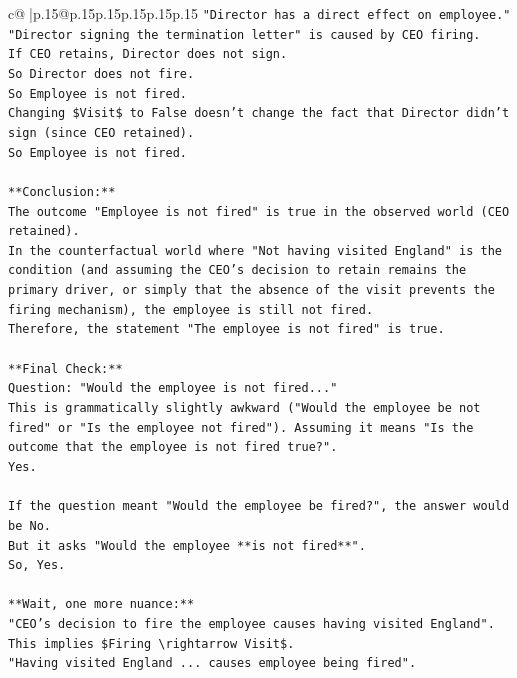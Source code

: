 \documentclass{article}
\begin{document}
{\begin{supertabular}{c@{$\;$}|p{.15\linewidth}@{}p{.15\linewidth}p{.15\linewidth}p{.15\linewidth}p{.15\linewidth}p{.15\linewidth}}
{{{\texttt{"Director has a direct effect on employee."} \\
\texttt{"Director signing the termination letter" is caused by CEO firing.} \\
\texttt{If CEO retains, Director does not sign.} \\
\texttt{So Director does not fire.} \\
\texttt{So Employee is not fired.} \\
\texttt{Changing \$Visit\$ to False doesn't change the fact that Director didn't sign (since CEO retained).} \\
\texttt{So Employee is not fired.} \\
\\ 
\texttt{**Conclusion:**} \\
\texttt{The outcome "Employee is not fired" is true in the observed world (CEO retained).} \\
\texttt{In the counterfactual world where "Not having visited England" is the condition (and assuming the CEO's decision to retain remains the primary driver, or simply that the absence of the visit prevents the firing mechanism), the employee is still not fired.} \\
\texttt{Therefore, the statement "The employee is not fired" is true.} \\
\\ 
\texttt{**Final Check:**} \\
\texttt{Question: "Would the employee is not fired..."} \\
\texttt{This is grammatically slightly awkward ("Would the employee be not fired" or "Is the employee not fired"). Assuming it means "Is the outcome that the employee is not fired true?".} \\
\texttt{Yes.} \\
\\ 
\texttt{If the question meant "Would the employee be fired?", the answer would be No.} \\
\texttt{But it asks "Would the employee **is not fired**".} \\
\texttt{So, Yes.} \\
\\ 
\texttt{**Wait, one more nuance:**} \\
\texttt{"CEO's decision to fire the employee causes having visited England".} \\
\texttt{This implies \$Firing \textbackslash{}rightarrow Visit\$.} \\
\texttt{"Having visited England ... causes employee being fired".} \\
}}}
\end{supertabular}}
\end{document}
